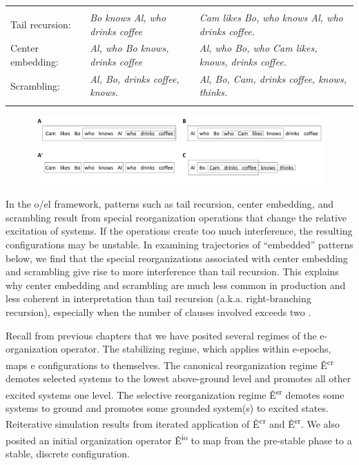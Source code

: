 \begin{tabularx}{\textwidth}{XXX} &  & \\
\lsptoprule
Tail recursion: & \textit{Bo knows Al, who drinks coffee} & \textit{Cam likes Bo, who knows Al, who drinks coffee.}\\
Center embedding: & \textit{Al, who Bo knows, drinks coffee} & \textit{Al, who Bo, who Cam likes, knows, drinks coffee.}\\
Scrambling: & \textit{Al, Bo, drinks coffee, knows.} & \textit{Al, Bo, Cam, drinks coffee, knows, thinks.}\\
\lspbottomrule
\end{tabularx}
  
\begin{figure}
\includegraphics[width=\textwidth]{figures/Tilsen-img118.png}
\caption{\missingcaption}
\label{fig:}
\end{figure}
 

  In the o/el framework, patterns such as tail recursion, center embedding, and scrambling result from special reorganization operations that change the relative excitation of systems. If the operations create too much interference, the resulting configurations may be unstable. In examining trajectories of “embedded” patterns below, we find that the special reorganizations associated with center embedding and scrambling give rise to more interference than tail recursion. This explains why center embedding and scrambling are much less common in production and less coherent in interpretation than tail recursion (a.k.a. right-branching recursion), especially when the number of clauses involved exceeds two \citep{ChristiansenChater1999}. 

  Recall from previous chapters that we have posited several regimes of the e-organization operator. The stabilizing regime, which applies within e-epochs, maps e configurations to themselves. The canonical reorganization regime Ê\textsuperscript{cr} demotes selected systems to the lowest above-ground level and promotes all other excited systems one level. The selective reorganization regime Ê\textsuperscript{sr} demotes some systems to ground and promotes some grounded system(s) to excited states. Reiterative simulation results from iterated application of Ê\textsuperscript{cr} and Ê\textsuperscript{sr}. We also posited an initial organization operator Ê\textsuperscript{io} to map from the pre-stable phase to a stable, discrete configuration.

